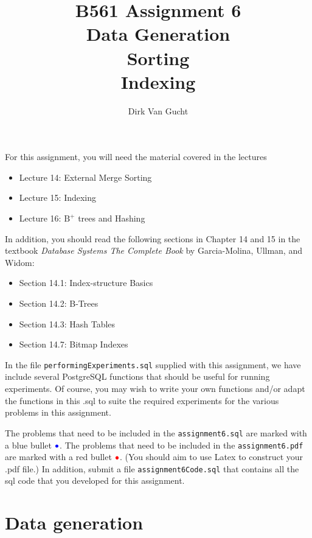 \documentclass{article}
\newcommand{\redbullet}{$\textcolor{red}{\bullet}$}
\newcommand{\bluebullet}{$\textcolor{blue}{\bullet}$}
\begin{document}
\title{B561 Assignment 6\\
Data Generation \\Sorting \\ Indexing}
\author{Dirk Van Gucht}
\date{}
\maketitle

For this assignment, you will need the material covered in the lectures
\begin{itemize}
\item Lecture 14: External Merge Sorting
\item Lecture 15: Indexing
\item Lecture 16: $\text{B}^+$ trees and Hashing
\end{itemize} 
In addition, you should read the following sections in Chapter 14 and 15 in the textbook \emph{Database Systems The Complete Book} by Garcia-Molina, Ullman, and Widom:
\begin{itemize}
\item Section 14.1: Index-structure Basics
\item Section 14.2: B-Trees
\item Section 14.3: Hash Tables
\item Section 14.7: Bitmap Indexes
\end{itemize} 

In the file {\tt performingExperiments.sql} supplied with this assignment, we have include several
PostgreSQL functions that should be useful for running experiments.     Of course, you may wish to write your own functions and/or adapt the functions in this .sql to suite the required experiments for the various problems in this assignment.

The problems that need to be included in the {\tt assignment6.sql} are marked with a blue bullet \bluebullet.
The problems that need to be included in the {\tt assignment6.pdf} are marked with a red bullet \redbullet.
(You should aim to use Latex to construct your .pdf file.)
In addition, submit a file {\tt assignment6Code.sql} that contains all the sql code that you developed for this assignment.



\newpage
\section{Data generation}
\end{document}
